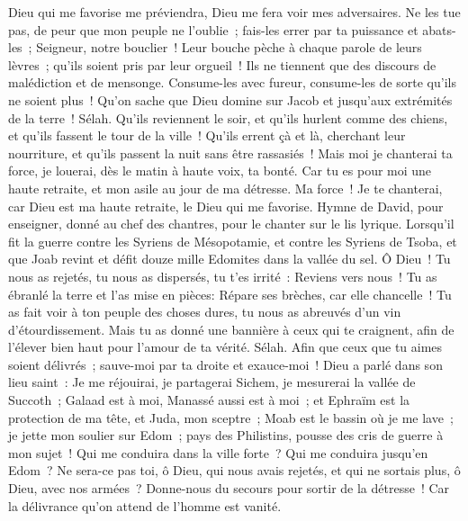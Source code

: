 \begin{multicols}{2}
Dieu qui me favorise me préviendra, Dieu me fera voir mes adversaires.
Ne les tue pas, de peur que mon peuple ne l'oublie~; fais-les errer par ta puissance et abats-les~; Seigneur, notre bouclier~!
Leur bouche pèche à chaque parole de leurs lèvres~; qu'ils soient pris par leur orgueil~! Ils ne tiennent que des discours de malédiction et de mensonge.
Consume-les avec fureur, consume-les de sorte qu'ils ne soient plus~! Qu'on sache que Dieu domine sur Jacob et jusqu'aux extrémités de la terre~! Sélah.
Qu'ils reviennent le soir, et qu'ils hurlent comme des chiens, et qu'ils fassent le tour de la ville~!
Qu'ils errent çà et là, cherchant leur nourriture, et qu'ils passent la nuit sans être rassasiés~!
Mais moi je chanterai ta force, je louerai, dès le matin à haute voix, ta bonté. Car tu es pour moi une haute retraite, et mon asile au jour de ma détresse.
Ma force~! Je te chanterai, car Dieu est ma haute retraite, le Dieu qui me favorise.
\VerseOne{}Hymne de David, pour enseigner, donné au chef des chantres, pour le chanter sur le lis lyrique.
Lorsqu'il fit la guerre contre les Syriens de Mésopotamie, et contre les Syriens de Tsoba, et que Joab revint et défit douze mille Edomites dans la vallée du sel.
Ô Dieu~! Tu nous as rejetés, tu nous as dispersés, tu t'es irrité~: Reviens vers nous~!
Tu as ébranlé la terre et l'as mise en pièces: Répare ses brèches, car elle chancelle~!
Tu as fait voir à ton peuple des choses dures, tu nous as abreuvés d'un vin d'étourdissement.
Mais tu as donné une bannière à ceux qui te craignent, afin de l'élever bien haut pour l'amour de ta vérité. Sélah.
Afin que ceux que tu aimes soient délivrés~; sauve-moi par ta droite et exauce-moi~!
Dieu a parlé dans son lieu saint~: Je me réjouirai, je partagerai Sichem, je mesurerai la vallée de Succoth~;
Galaad est à moi, Manassé aussi est à moi~; et Ephraïm est la protection de ma tête, et Juda, mon sceptre~;
Moab est le bassin où je me lave~; je jette mon soulier sur Edom~; pays des Philistins, pousse des cris de guerre à mon sujet~!
Qui me conduira dans la ville forte~? Qui me conduira jusqu'en Edom~?
Ne sera-ce pas toi, ô Dieu, qui nous avais rejetés, et qui ne sortais plus, ô Dieu, avec nos armées~?
Donne-nous du secours pour sortir de la détresse~! Car la délivrance qu'on attend de l'homme est vanité.

\end{multicols}
